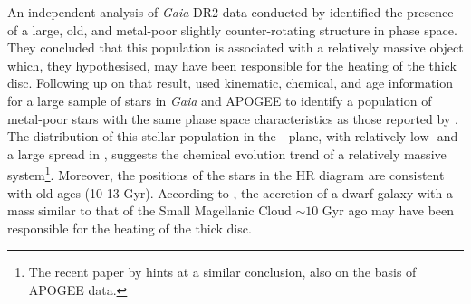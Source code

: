 An independent analysis of \emph{Gaia} DR2 data conducted by
\citet{2018ApJ...860L..11K} identified the presence of a large,
old, and metal-poor slightly counter-rotating structure in phase space.
They concluded that this population is associated with a relatively
massive object which, they hypothesised, may have been responsible
for the heating of the thick disc.  Following up on that result,
\citet{2018arXiv180606038H} used kinematic, chemical, and age
information for a large sample of stars in \emph{Gaia} and APOGEE
to identify a population of metal-poor stars with the same phase
space characteristics as those reported by
\citet{2018ApJ...860L..11K}.  The distribution of this stellar
population in the \afe{}-\feh{} plane, with relatively low-\afe{}
and a large spread in \feh{}, suggests the chemical evolution trend
of a relatively massive system\footnote{The recent paper by
\citet{2018arXiv180707269F} hints at a similar conclusion, also on
the basis of APOGEE data.}.  Moreover, the positions of the stars
in the HR diagram are consistent with old ages (10-13 Gyr).  According
to  \citet{2018arXiv180606038H}, the accretion of a dwarf galaxy
with a mass similar to that of the Small Magellanic Cloud
\citep[see also][]{2018ApJ...852...49H} $\sim 10$ Gyr ago may have
been responsible for the heating of the thick disc. 


